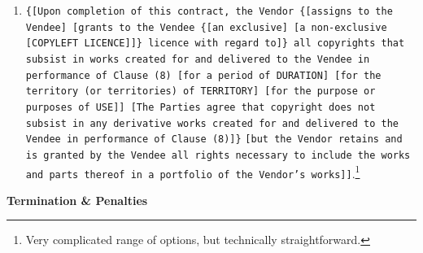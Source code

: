\documentclass[a4paper,12pt]{article}
\begin{document}
\begin{enumerate}[resume]
	\item \texttt{\{[Upon completion of this contract, the Vendor \{[assigns to the Vendee] [grants to the Vendee \{[an exclusive] [a non-exclusive} \texttt{[\colorbox{branding}{COPYLEFT LICENCE}]]\} licence with regard to]\} all copyrights that subsist in works created for and delivered to the Vendee in performance of Clause (8) [for a period of \colorbox{branding}{DURATION}] [for the territory (or territories) of \colorbox{branding}{TERRITORY}] [for the purpose or purposes of \colorbox{branding}{USE}]] [The Parties agree that copyright does not subsist in any derivative works created for and delivered to the Vendee in performance of Clause (8)]\}} \texttt{[but the Vendor retains and is granted by the Vendee all rights necessary to include the works and parts thereof in a portfolio of the Vendor's works]]}.\footnote{Very complicated range of options, but technically straightforward.}
\end{enumerate}

\textbf{Termination \& Penalties}
\end{document}
